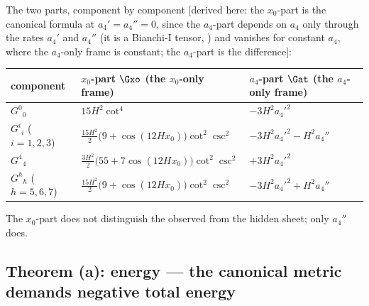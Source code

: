 The two parts, component by component [derived here: the $x_0$-part is the canonical formula at
$a_4'=a_4''=0$, since the $a_4$-part depends on $a_4$ only through the rates $a_4'$ and $a_4''$ (it is a
Bianchi-I tensor, ) and vanishes for constant $a_4$, where the $a_4$-only frame is
constant; the $a_4$-part is the difference]:
\begin{center}
\renewcommand{\arraystretch}{1.35}
\begin{tabular}{@{}lll@{}}
\toprule
component & $x_0$-part $\Gxo$ (the $x_0$-only frame) & $a_4$-part $\Gat$ (the $a_4$-only frame)\\
\midrule
$G^0{}_0$ & $15H^2\cot^4$ & $-3H^2a_4'^2$\\
$G^i{}_i$ ($i=1,2,3$) & $\frac{15H^2}{2}\bigl(9+\cos(12Hx_0)\bigr)\cot^2\csc^2$ & $-3H^2a_4'^2-H^2a_4''$\\
$G^4{}_4$ & $\frac{3H^2}{2}\bigl(55+7\cos(12Hx_0)\bigr)\cot^2\csc^2$ & $+3H^2a_4'^2$\\
$G^h{}_h$ ($h=5,6,7$) & $\frac{15H^2}{2}\bigl(9+\cos(12Hx_0)\bigr)\cot^2\csc^2$ & $-3H^2a_4'^2+H^2a_4''$\\
\bottomrule
\end{tabular}
\end{center}
The $x_0$-part does not distinguish the observed from the hidden sheet; only $a_4''$ does.

\subsection{Theorem (a): energy --- the canonical metric demands negative total energy}
\label{sec:4.4}

